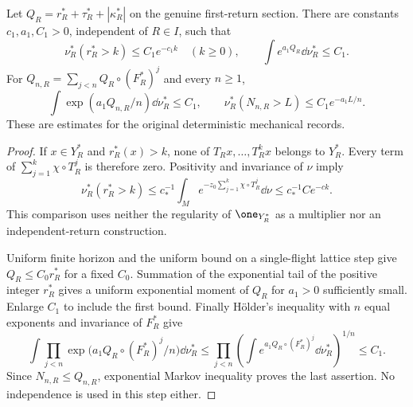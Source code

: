 \begin{theorem}
\label{thm:exponential-return}
Let
$Q_R=r_R^*+\tau_R^*+|\kappa_R^*|$ on the genuine first-return section.
There are constants $c_1,a_1,C_1>0$, independent of $R\in I$, such that
\begin{equation}\label{eq:exponential-return}
 \nu_R^*(r_R^*>k)\le C_1e^{-c_1k}\quad(k\ge0),\qquad
 \int e^{a_1 Q_R}\dd\nu_R^*\le C_1.
\end{equation}
For $Q_{n,R}=\sum_{j<n}Q_R\circ(F_R^*)^j$ and every $n\ge1$,
\begin{equation}\label{eq:block-exponential-moment}
 \int\exp(a_1 Q_{n,R}/n)\dd\nu_R^*\le C_1,\qquad
 \nu_R^*(N_{n,R}>L)\le C_1e^{-a_1L/n}.
\end{equation}
These are estimates for the original deterministic mechanical records.
\end{theorem}
\begin{proof}
If $x\in Y_R^*$ and $r_R^*(x)>k$, none of $T_Rx,\ldots,T_R^kx$
belongs to $Y_R^*$. Every term of $\sum_{j=1}^k\chi\circ T_R^j$ is
therefore zero. Positivity and invariance of $\nu$ imply
\[
 \nu_R^*(r_R^*>k)
 \le c_*^{-1}\int_M e^{-z_0\sum_{j=1}^k\chi\circ T_R^j}\dd\nu
 \le c_*^{-1}Ce^{-ck}.
\]
This comparison uses neither the regularity of $\one_{Y_R^*}$ as a
multiplier nor an independent-return construction.

Uniform finite horizon and the uniform bound on a single-flight lattice
step give $Q_R\le C_0 r_R^*$ for a fixed $C_0$. Summation of the
exponential tail of the positive integer $r_R^*$ gives a uniform
exponential moment of $Q_R$ for $a_1>0$ sufficiently small. Enlarge
$C_1$ to include the first bound. Finally H\"older's inequality with
$n$ equal exponents and invariance of $F_R^*$ give
\[
 \int\prod_{j<n}\exp\bigl(a_1Q_R\circ(F_R^*)^j/n\bigr)\dd\nu_R^*
 \le\prod_{j<n}\left(\int e^{a_1Q_R\circ(F_R^*)^j}\dd\nu_R^*\right)^{1/n}
 \le C_1.
\]
Since $N_{n,R}\le Q_{n,R}$, exponential Markov inequality proves the
last assertion. No independence is used in this step either.
\end{proof}

